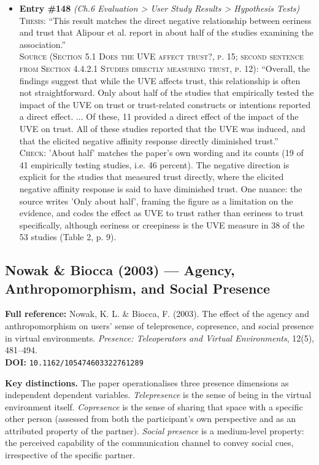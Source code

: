 \documentclass[11pt, a4paper]{article}
\begin{document}
\begin{itemize}[leftmargin=1.2em,itemsep=4pt]
\item \textbf{Entry \#148} \textit{(Ch.6 Evaluation > User Study Results > Hypothesis Tests)}\\
\textsc{Thesis:} ``This result matches the direct negative relationship between eeriness and trust that Alipour et al. report in about half of the studies examining the association.''\\
\textsc{Source (Section 5.1 Does the UVE affect trust?, p. 15; second sentence from Section 4.4.2.1 Studies directly measuring trust, p. 12):} ``Overall, the findings suggest that while the UVE affects trust, this relationship is often not straightforward. Only about half of the studies that empirically tested the impact of the UVE on trust or trust-related constructs or intentions reported a direct effect. ... Of these, 11 provided a direct effect of the impact of the UVE on trust. All of these studies reported that the UVE was induced, and that the elicited negative affinity response directly diminished trust.''\\
\textsc{Check:} 'About half' matches the paper's own wording and its counts (19 of 41 empirically testing studies, i.e. 46 percent). The negative direction is explicit for the studies that measured trust directly, where the elicited negative affinity response is said to have diminished trust. One nuance: the source writes 'Only about half', framing the figure as a limitation on the evidence, and codes the effect as UVE to trust rather than eeriness to trust specifically, although eeriness or creepiness is the UVE measure in 38 of the 53 studies (Table 2, p. 9).
\end{itemize}

\vspace{8pt}
\subsection{Nowak \& Biocca (2003) --- Agency, Anthropomorphism, and Social Presence}

\begin{refbox}
\textbf{Full reference:} Nowak, K. L. \& Biocca, F. (2003). The effect of the agency and anthropomorphism on users' sense of telepresence, copresence, and social presence in virtual environments. \textit{Presence: Teleoperators and Virtual Environments}, 12(5), 481--494.\\[4pt]
\textbf{DOI:} \texttt{10.1162/105474603322761289}
\end{refbox}

\textbf{Key distinctions.} The paper operationalises three presence dimensions as independent dependent variables. \textit{Telepresence} is the sense of being in the virtual environment itself. \textit{Copresence} is the sense of sharing that space with a specific other person (assessed from both the participant's own perspective and as an attributed property of the partner). \textit{Social presence} is a medium-level property: the perceived capability of the communication channel to convey social cues, irrespective of the specific partner.
\end{document}
